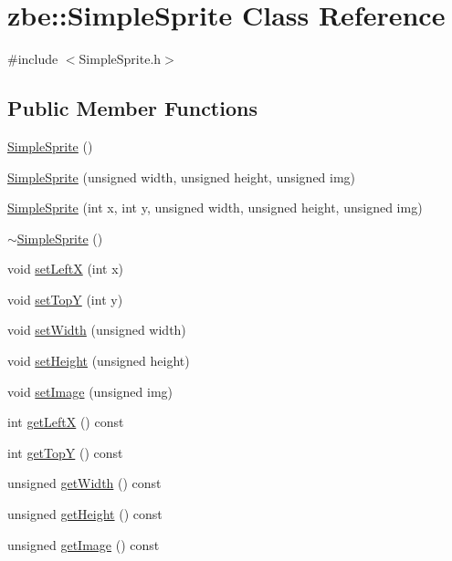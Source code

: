 \hypertarget{classzbe_1_1_simple_sprite}{}\section{zbe\+:\+:Simple\+Sprite Class Reference}
\label{classzbe_1_1_simple_sprite}


{\ttfamily \#include $<$Simple\+Sprite.\+h$>$}

\subsection*{Public Member Functions}
\begin{DoxyCompactItemize}
\item 
\hyperlink{classzbe_1_1_simple_sprite_aa69fa08ed54f96fccf9ee6c7f23e87a1}{Simple\+Sprite} ()
\item 
\hyperlink{classzbe_1_1_simple_sprite_a7b58550af6e09561d35a03b5bb66a9b3}{Simple\+Sprite} (unsigned width, unsigned height, unsigned img)
\item 
\hyperlink{classzbe_1_1_simple_sprite_a187547fd761f559c97a2d4d95c8da277}{Simple\+Sprite} (int x, int y, unsigned width, unsigned height, unsigned img)
\item 
\hyperlink{classzbe_1_1_simple_sprite_ab11cf4d8abd2624165472efe7846615b}{$\sim$\+Simple\+Sprite} ()
\item 
void \hyperlink{classzbe_1_1_simple_sprite_afb93da780f6e1bca773c5026ce5045b7}{set\+Left\+X} (int x)
\item 
void \hyperlink{classzbe_1_1_simple_sprite_a03726cc6ded8ae30351cae031702aed3}{set\+Top\+Y} (int y)
\item 
void \hyperlink{classzbe_1_1_simple_sprite_aa5758be3c6bc1e13cdd69861ca48f8ce}{set\+Width} (unsigned width)
\item 
void \hyperlink{classzbe_1_1_simple_sprite_a0fb0a122ee902c9dd34945bf926e0899}{set\+Height} (unsigned height)
\item 
void \hyperlink{classzbe_1_1_simple_sprite_a0bc876cc324b11968a4decb241ae521c}{set\+Image} (unsigned img)
\item 
int \hyperlink{classzbe_1_1_simple_sprite_a031c01a6cc162b01113107b345aeaa61}{get\+Left\+X} () const 
\item 
int \hyperlink{classzbe_1_1_simple_sprite_af004923d23cb1ea3f3cf851b47a88562}{get\+Top\+Y} () const 
\item 
unsigned \hyperlink{classzbe_1_1_simple_sprite_aba0207ed8eb791d9300a5eafe55ef1a7}{get\+Width} () const 
\item 
unsigned \hyperlink{classzbe_1_1_simple_sprite_ae42bad4677f86bc86cb61c5a0f9c8c51}{get\+Height} () const 
\item 
unsigned \hyperlink{classzbe_1_1_simple_sprite_af9654d9a43b9faec87285c116f595c0d}{get\+Image} () const 
\end{DoxyCompactItemize}


